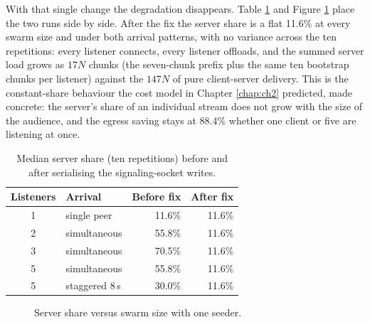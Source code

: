 \par With that single change the degradation disappears. Table \ref{tab:eval-scaling} and Figure \ref{fig:eval-scaling} place the two runs side by side. After the fix the server share is a flat 11.6\% at every swarm size and under both arrival patterns, with no variance across the ten repetitions: every listener connects, every listener offloads, and the summed server load grows as $17N$ chunks (the seven-chunk prefix plus the same ten bootstrap chunks per listener) against the $147N$ of pure client-server delivery. This is the constant-share behaviour the cost model in Chapter \ref{chap:ch2} predicted, made concrete: the server's share of an individual stream does not grow with the size of the audience, and the egress saving stays at 88.4\% whether one client or five are listening at once.

\begin{table}[htbp]
\centering
\begin{tabular}{|c|l|r|r|}
\hline
\textbf{Listeners} & \textbf{Arrival} & \textbf{Before fix} & \textbf{After fix} \\
\hline
1 & single peer    & 11.6\% & 11.6\% \\
2 & simultaneous   & 55.8\% & 11.6\% \\
3 & simultaneous   & 70.5\% & 11.6\% \\
5 & simultaneous   & 55.8\% & 11.6\% \\
5 & staggered 8\,s & 30.0\% & 11.6\% \\
\hline
\end{tabular}
\caption{Median server share (ten repetitions) before and after serialising the signaling-socket writes.}
\label{tab:eval-scaling}
\end{table}

\begin{figure}[htbp]
\centering
{}
\caption{Server share versus swarm size with one seeder.}
\label{fig:eval-scaling}
\end{figure}

